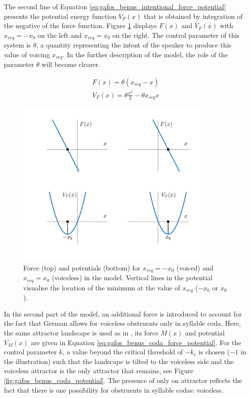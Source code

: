 The second line of Equation \ref{eq:gafos_benus_intentional_force_potential} presents the potential energy function $V_F(x)$ that is obtained by integration of the negative of the force function. Figure \ref{fig:gafos_benus_intentional_force_potential} displays $F(x)$ and $V_F(x)$ with $x_{req} = -x_0$ on the left and $x_{req} = x_0$ on the right. The control parameter of this system is $\theta$, a quantity representing the intent of the speaker to produce this value of voicing $x_{req}$. In the further description of the model, the role of the parameter $\theta$ will become clearer.

\begin{equation}
\begin{split}
F(x) = \theta (x_{req} - x) \\
V_F(x) = \theta \frac{x^2}{2} -\theta x_{req} x
\end{split}
\label{eq:gafos_benus_intentional_force_potential}
\end{equation}

\begin{figure}
\includegraphics[width=10cm]{figures/ch3/gafos_benus_intentional_dynamics.pdf}
\caption[Force and potential for voiced and voiceless obstruents in the \citet{GafosBenus2006} model.]{Force (top) and potentials (bottom) for $x_{req} = -x_0$ (voiced) and $x_{req} = x_0$ (voiceless) in the \citet{GafosBenus2006} model. Vertical lines in the potential visualise the location of the minimum at the value of $x_{req}$ ($-x_0$ or $x_0$).}
\label{fig:gafos_benus_intentional_force_potential}
\end{figure}

In the second part of the model, an additional force is introduced to account for\largerpage{} the fact that German allows for voiceless obstruents only in syllable coda. Here, the same attractor landscape is used as in \citet{Tulleretal1994}, its force $M(x)$ and potential $V_M(x)$ are given in Equation \ref{eq:gafos_benus_coda_force_potential}. For the control parameter $k$, a value beyond the critical threshold of $-k_c$ is chosen ($-1$ in the illustration) such that the landscape is tilted to the voiceless side and the voiceless attractor is the only attractor that remains, see Figure \ref{fig:gafos_benus_coda_potential}. The presence of only on attractor reflects the fact that there is one possibility for obstruents in syllable codas: voiceless.

